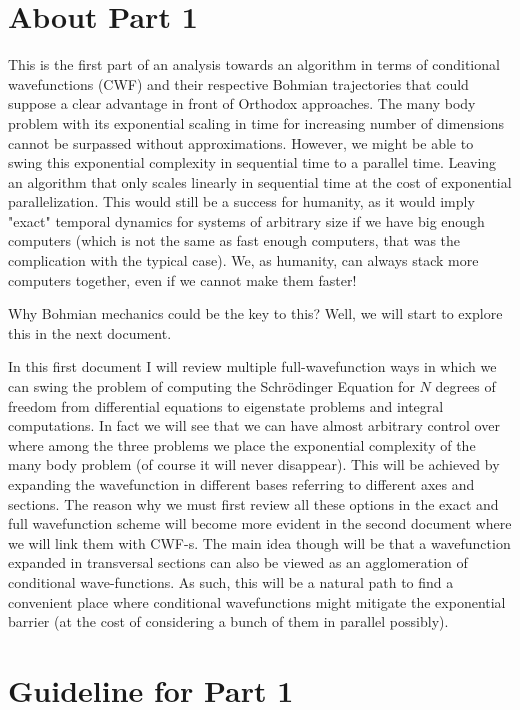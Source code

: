 \documentclass[11pt, a4paper]{article} %
\begin{document}
%
\section*{About Part 1}\vspace{-0.2cm}
This is the first part of an analysis towards an algorithm in terms of conditional wavefunctions (CWF) and their respective Bohmian trajectories that could suppose a clear advantage in front of Orthodox approaches. The many body problem with its exponential scaling in time for increasing number of dimensions cannot be surpassed without approximations. However, we might be able to swing this exponential complexity in sequential time to a parallel time. Leaving an algorithm that only scales linearly in sequential time at the cost of exponential parallelization. This would still be a success for humanity, as it would imply "exact" temporal dynamics for systems of arbitrary size if we have big enough computers (which is not the same as fast enough computers, that was the complication with the typical case). We, as humanity, can always stack more computers together, even if we cannot make them faster!

Why Bohmian mechanics could be the key to this? Well, we will start to explore this in the next document.

In this first document I will review multiple full-wavefunction ways in which we can swing the problem of computing the Schrödinger Equation for $N$ degrees of freedom from differential equations to eigenstate problems and integral computations. In fact we will see that we can have almost arbitrary control over where among the three problems we place the exponential complexity of the many body problem (of course it will never disappear). This will be achieved by expanding the wavefunction in different bases referring to different axes and sections. The reason why we must first review all these options in the exact and full wavefunction scheme will become more evident in the second document where we will link them with CWF-s. The main idea though will be that a wavefunction expanded in transversal sections can also be viewed as an agglomeration of conditional wave-functions. As such, this will be a natural path to find a convenient place where conditional wavefunctions might mitigate the exponential barrier (at the cost of considering a bunch of them in parallel possibly).


\section*{Guideline for Part 1}\vspace{-0.2cm}
\end{document}
